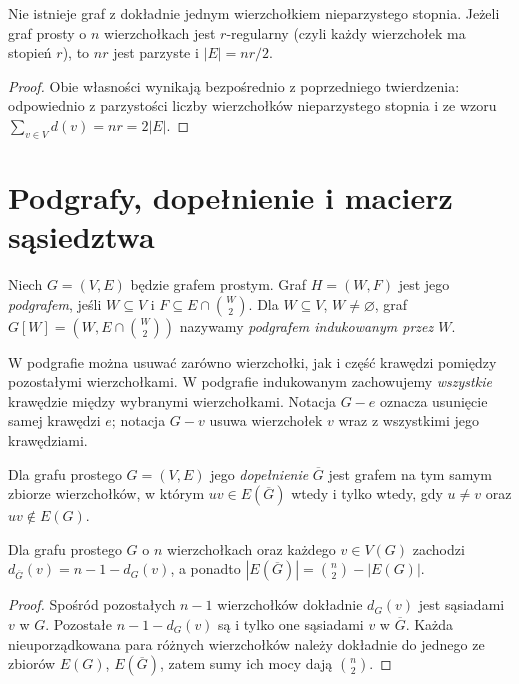 \begin{wniosek}
Nie istnieje graf z dokładnie jednym wierzchołkiem
nieparzystego stopnia. Jeżeli graf prosty o $n$
wierzchołkach jest $r$-regularny (czyli każdy wierzchołek
ma stopień $r$), to $nr$ jest parzyste i
$|E|=nr/2$.
\end{wniosek}

\begin{proof}
Obie własności wynikają bezpośrednio z poprzedniego
twierdzenia: odpowiednio z parzystości liczby
wierzchołków nieparzystego stopnia i ze wzoru
$\sum_{v\in V}d(v)=nr=2|E|$.
\end{proof}

\section{Podgrafy, dopełnienie i macierz sąsiedztwa}
\label{sec:tg-podgrafy}

\begin{definicja}
Niech $G=(V,E)$ będzie grafem prostym. Graf
$H=(W,F)$ jest jego \emph{podgrafem}, jeśli
$W\subseteq V$ i $F\subseteq E\cap\binom W2$.
Dla $W\subseteq V$, $W\ne\varnothing$, graf
$G[W]=(W,E\cap\binom W2)$ nazywamy
\emph{podgrafem indukowanym przez $W$}.
\end{definicja}

W podgrafie można usuwać zarówno wierzchołki, jak i część
krawędzi pomiędzy pozostałymi wierzchołkami. W podgrafie
indukowanym zachowujemy \emph{wszystkie} krawędzie między
wybranymi wierzchołkami. Notacja $G-e$ oznacza usunięcie
samej krawędzi $e$; notacja $G-v$ usuwa wierzchołek $v$
wraz z wszystkimi jego krawędziami.

\begin{definicja}[Dopełnienie]
Dla grafu prostego $G=(V,E)$ jego
\emph{dopełnienie} $\overline G$ jest grafem na
tym samym zbiorze wierzchołków, w którym
$uv\in E(\overline G)$ wtedy i tylko wtedy,
gdy $u\ne v$ oraz $uv\notin E(G)$.
\end{definicja}

\begin{stwierdzenie}
Dla grafu prostego $G$ o $n$ wierzchołkach oraz
każdego $v\in V(G)$ zachodzi
$d_{\overline G}(v)=n-1-d_G(v)$, a ponadto
$|E(\overline G)|=\binom n2-|E(G)|$.
\end{stwierdzenie}

\begin{proof}
Spośród pozostałych $n-1$ wierzchołków dokładnie
$d_G(v)$ jest sąsiadami $v$ w $G$. Pozostałe
$n-1-d_G(v)$ są i tylko one sąsiadami $v$ w
$\overline G$. Każda nieuporządkowana para różnych
wierzchołków należy dokładnie do jednego ze zbiorów
$E(G)$, $E(\overline G)$, zatem sumy ich mocy dają
$\binom n2$.
\end{proof}

